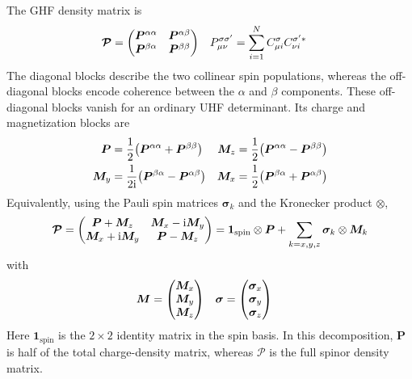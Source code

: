 \documentclass[11pt,a4paper,titlepage]{article}
\numberwithin{equation}{section}
\newcommand{\bI}{\boldsymbol{1}}
\newcommand{\bM}{\boldsymbol{M}}
\newcommand{\bP}{\boldsymbol{P}}
\newcommand{\ii}{\mathrm{i}}
\begin{document}
The GHF density matrix is
\begin{align}
    \boldsymbol{\mathcal P}&=\mqty(
      \bP^{\alpha\alpha}&\bP^{\alpha\beta}\\
      \bP^{\beta\alpha}&\bP^{\beta\beta})
  &
  P_{\mu\nu}^{\sigma\sigma'}
  &=\sum_{i=1}^{N}C_{\mu i}^\sigma C_{\nu i}^{\sigma' *}
\end{align}
The diagonal blocks describe the two collinear spin populations, whereas the
off-diagonal blocks encode coherence between the $\alpha$ and $\beta$
components. These off-diagonal blocks vanish for an ordinary UHF determinant.
Its charge and magnetization blocks are
\begin{align}
  \bP&=\frac12\qty(\bP^{\alpha\alpha}+\bP^{\beta\beta})
  &
  \bM_z&=\frac12\qty(\bP^{\alpha\alpha}-\bP^{\beta\beta})
  \\
  \bM_y&=\frac{1}{2\ii}\qty(\bP^{\beta\alpha}-\bP^{\alpha\beta})
  &
  \bM_x&=\frac12\qty(\bP^{\beta\alpha}+\bP^{\alpha\beta})
\end{align}
Equivalently, using the Pauli spin matrices $\boldsymbol{\sigma}_k$ and
the Kronecker product $\otimes$,
\begin{equation}
  \boldsymbol{\mathcal P}
  =\mqty(
    \bP+\bM_z&\bM_x-\ii\bM_y\\
    \bM_x+\ii\bM_y&\bP-\bM_z)
  =\bI_\text{spin}\otimes\bP
   +\sum_{k=x,y,z}\boldsymbol{\sigma}_k\otimes\bM_k
\end{equation}
with
\begin{align}
  \bM&=\mqty(\bM_x\\\bM_y\\\bM_z)
  &
  \boldsymbol{\sigma}
  &=\mqty(\boldsymbol{\sigma}_x\\\boldsymbol{\sigma}_y\\
    \boldsymbol{\sigma}_z)
\end{align}
Here $\bI_\text{spin}$ is the $2\times2$ identity matrix in the spin basis. 
In this decomposition,
$\bP$ is half of the total charge-density matrix, whereas
$\boldsymbol{\mathcal P}$ is the full spinor density matrix.
\end{document}
